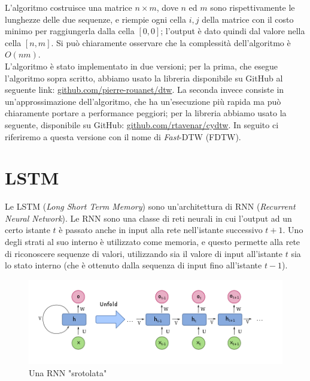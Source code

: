 \documentclass[8pt,notitlepage]{report}
\begin{document}
		L'algoritmo costruisce una matrice $ n \times m $, dove $ n $ ed $ m $ sono rispettivamente le lunghezze delle due sequenze, e riempie ogni cella $ i, j $ della matrice con il costo minimo per raggiungerla dalla cella $ [0, 0] $; l'output è dato quindi dal valore nella cella $ [n, m] $. Si può chiaramente osservare che la complessità dell'algoritmo è $ O(nm) $.\\
		L'algoritmo è stato implementato in due versioni; per la prima, che esegue l'algoritmo sopra scritto, abbiamo usato la libreria disponibile su GitHub al seguente link: \href{https://github.com/pierre-rouanet/dtw}{github.com/pierre-rouanet/dtw}. La seconda invece consiste in un'approssimazione dell'algoritmo, che ha un'esecuzione più rapida ma può chiaramente portare a performance peggiori; per la libreria abbiamo usato la seguente, disponibile su GitHub: \href{https://github.com/rtavenar/cydtw}{github.com/rtavenar/cydtw}. In seguito ci riferiremo a questa versione con il nome di \textit{Fast}-DTW (FDTW).
		
		\newpage
		

	\section{LSTM}
		Le LSTM (\textit{Long Short Term Memory}) sono un'architettura di RNN (\textit{Recurrent Neural Network}). Le RNN sono una classe di reti neurali in cui l'output ad un certo istante $ t $ è passato anche in input alla rete nell'istante successivo $ t + 1 $. Uno degli strati al suo interno è utilizzato come memoria, e questo permette alla rete di riconoscere sequenze di valori, utilizzando sia il valore di input all'istante $ t $ sia lo stato interno (che è ottenuto dalla sequenza di input fino all'istante $ t - 1 $). 
		
		\begin{figure}[H]
			\begin{center}
				\includegraphics[scale=.55]{rnn}
				\caption{Una RNN "srotolata"}
			\end{center}
		\end{figure}
		
\end{document}
